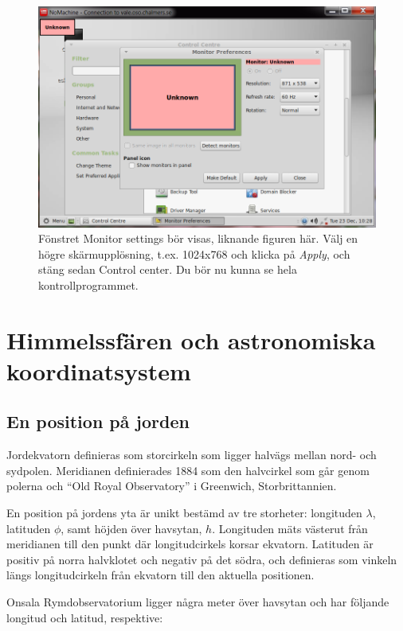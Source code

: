 \begin{figure}[H]
    \centering
    \includegraphics[height=0.3\paperheight]{../figures/nomachinefigs/fig11_monitors.png}
	\caption{Fönstret Monitor settings bör visas, liknande figuren här. Välj en högre skärmupplösning, t.ex. 
		1024x768 och klicka på \emph{Apply}, och stäng sedan Control center. Du bör nu kunna se hela kontrollprogrammet. }
    \label{fig:monitors}
\end{figure}

\chapter{Himmelssfären och astronomiska koordinatsystem}
\label{app:coord}

\section{En position på jorden}

Jordekvatorn definieras som storcirkeln som ligger halvägs mellan
nord- och sydpolen. Meridianen definierades 1884 som den halvcirkel
som går genom polerna och ``Old Royal Observatory'' i Greenwich,
Storbrittannien. 

En position på jordens yta är unikt bestämd av tre storheter:
longituden $\lambda$, latituden $\phi$, samt höjden över havsytan,
$h$. Longituden mäts västerut från meridianen till den punkt där
longitudcirkels korsar ekvatorn. Latituden är positiv på norra
halvklotet och negativ på det södra, och definieras som vinkeln längs
longitudcirkeln från ekvatorn till den aktuella positionen.

Onsala Rymdobservatorium ligger några meter över havsytan och har
följande longitud och latitud, respektive:

